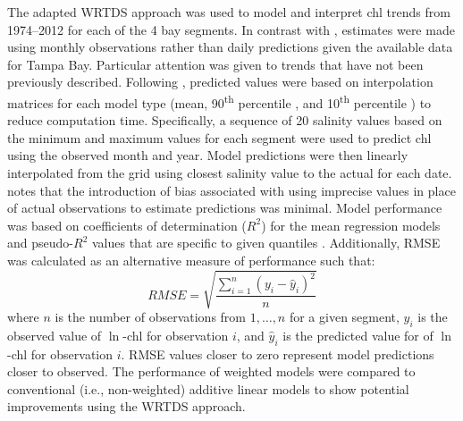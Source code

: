 \documentclass[letterpaper,12pt,oneside]{article}\usepackage{graphicx, color}
\newcommand{\nine}{90\textsuperscript{th} percentile }
\newcommand{\ten}{10\textsuperscript{th} percentile }
\begin{document}
The adapted \ac{WRTDS} approach was used to model and interpret \ac{chl} trends from 1974--2012 for each of the 4 bay segments.  In contrast with \citep{Hirsch10}, estimates were made using monthly observations rather than daily predictions given the available data for Tampa Bay.  Particular attention was given to trends that have not been previously described.  Following \citet{Hirsch10}, predicted values were based on interpolation matrices for each model type (mean, \nine, and \ten) to reduce computation time.  Specifically, a sequence of 20 salinity values based on the minimum and maximum values for each segment were used to predict \ac{chl} using the observed month and year.  Model predictions were then linearly interpolated from the grid using closest salinity value to the actual for each date.  \citet{Hirsch10} notes that the introduction of bias associated with using imprecise values in place of actual observations to estimate predictions was minimal.  Model performance was based on coefficients of determination ($R^2$) for the mean regression models and pseudo-$R^2$ values that are specific to given quantiles \citep{Koenker99}.  Additionally, \ac{RMSE} was calculated as an alternative measure of performance such that:
\begin{equation}
RMSE = \sqrt {{\frac{{\sum\limits_{{i = 1}}^n {{{\left( {{y_i} - {{\hat{y}}_i}} \right)}^2}} }}{{n}}}}
\end{equation}
\noindent where $n$ is the number of observations from $1,\ldots,n$ for a given segment, $y_i$ is the observed value of $\ln$-\ac{chl} for observation $i$, and ${\hat{y}}_i$ is the predicted value for of $\ln$-\ac{chl} for observation $i$.  \ac{RMSE} values closer to zero represent model predictions closer to observed. The performance of weighted models were compared to conventional (i.e., non-weighted) additive linear models to show potential improvements using the \ac{WRTDS} approach.   
\end{document}
